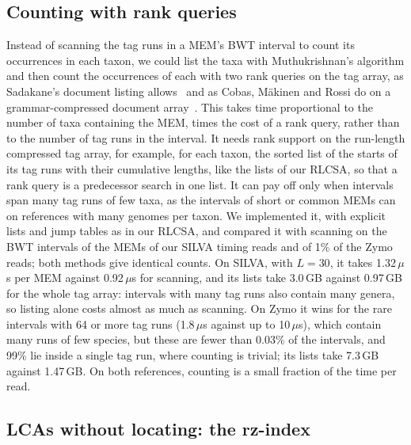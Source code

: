 \subsection{Counting with rank queries}
\label{app:rank}

Instead of scanning the tag runs in a MEM's BWT interval to count its occurrences in each taxon, we could list the taxa with Muthukrishnan's algorithm and then count the occurrences of each with two rank queries on the tag array, as Sadakane's document listing allows~\cite{Sad07} and as Cobas, M\"akinen and Rossi do on a grammar-compressed document array~\cite{CMR20}.
This takes time proportional to the number of taxa containing the MEM, times the cost of a rank query, rather than to the number of tag runs in the interval.
It needs rank support on the run-length compressed tag array, for example, for each taxon, the sorted list of the starts of its tag runs with their cumulative lengths, like the lists of our RLCSA, so that a rank query is a predecessor search in one list.
It can pay off only when intervals span many tag runs of few taxa, as the intervals of short or common MEMs can on references with many genomes per taxon.
We implemented it, with explicit lists and jump tables as in our RLCSA, and compared it with scanning on the BWT intervals of the MEMs of our SILVA timing reads and of 1\% of the Zymo reads; both methods give identical counts.
On SILVA, with $L = 30$, it takes 1.32\,$\mu$s per MEM against 0.92\,$\mu$s for scanning, and its lists take 3.0\,GB against 0.97\,GB for the whole tag array: intervals with many tag runs also contain many genera, so listing alone costs almost as much as scanning.
On Zymo it wins for the rare intervals with 64 or more tag runs (1.8\,$\mu$s against up to 10\,$\mu$s), which contain many runs of few species, but these are fewer than 0.03\% of the intervals, and 99\% lie inside a single tag run, where counting is trivial; its lists take 7.3\,GB against 1.47\,GB.
On both references, counting is a small fraction of the time per read.

\subsection{LCAs without locating: the rz-index}
\label{sec:rz}

